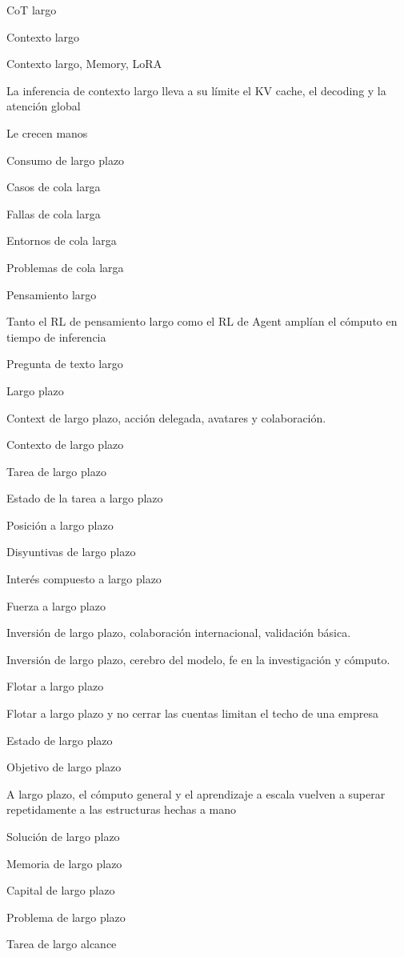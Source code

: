 \documentclass{article}
\begin{document}
CoT largo

Contexto largo

Contexto largo, Memory, LoRA

La inferencia de contexto largo lleva a su límite el KV cache, el decoding y la atención global

Le crecen manos

Consumo de largo plazo

Casos de cola larga

Fallas de cola larga

Entornos de cola larga

Problemas de cola larga

Pensamiento largo

Tanto el RL de pensamiento largo como el RL de Agent amplían el cómputo en tiempo de inferencia

Pregunta de texto largo

Largo plazo

Context de largo plazo, acción delegada, avatares y colaboración.

Contexto de largo plazo

Tarea de largo plazo

Estado de la tarea a largo plazo

Posición a largo plazo

Disyuntivas de largo plazo

Interés compuesto a largo plazo

Fuerza a largo plazo

Inversión de largo plazo, colaboración internacional, validación básica.

Inversión de largo plazo, cerebro del modelo, fe en la investigación y cómputo.

Flotar a largo plazo

Flotar a largo plazo y no cerrar las cuentas limitan el techo de una empresa

Estado de largo plazo

Objetivo de largo plazo

A largo plazo, el cómputo general y el aprendizaje a escala vuelven a superar repetidamente a las estructuras hechas a mano

Solución de largo plazo

Memoria de largo plazo

Capital de largo plazo

Problema de largo plazo

Tarea de largo alcance
\end{document}
